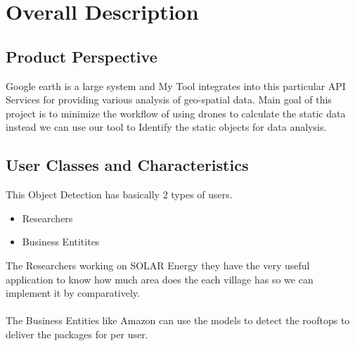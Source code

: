 	
	
	
	
	
	
	
	
	
	
	
	
	
	
	
	
	
	
	\section{Overall Description}
	
	\subsection{Product Perspective}
	Google earth is a large system and My Tool integrates into this particular API Services for providing various analysis of geo-spatial data. Main goal of this project is to minimize the workflow of using drones to calculate the static data instead we can use our tool to Identify the static objects for data analysis.
	
	
	
	
	
	
	
	
	
	\subsection{User Classes and Characteristics}
	This Object Detection has basically 2 types of users. 
	\begin{itemize}
		\item Researchers
		\item Business Entitites 
	\end{itemize}
	The Researchers working on SOLAR Energy they have the very useful application to know how much area does the each village has so we can implement it by comparatively.\\\\
	The Business Entities like Amazon can use the models to detect the rooftops to deliver the packages for per user.
	
